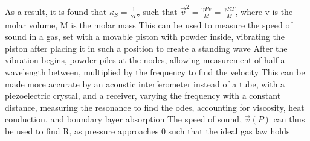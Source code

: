 \begin{outline*}
\3 As a result, it is found that $\kappa_S = \frac{1}{\gamma P}$, such that $\vec{v}^2 = \frac{\gamma P v}{M} = \frac{\gamma RT}{M}$, where v is the molar volume, M is the molar mass
\3 This can be used to measure the speed of sound in a gas, set with a movable piston with powder inside, vibrating the piston after placing it in such a position to create a standing wave
\4 After the vibration begins, powder piles at the nodes, allowing measurement of half a wavelength between, multiplied by the frequency to find the velocity
\4 This can be made more accurate by an acoustic interferometer instead of a tube, with a piezoelectric crystal, and a receiver, varying the frequency with a constant distance, measuring the resonance to find the odes, accounting for viscosity, heat conduction, and boundary layer absorption
\4 The speed of sound, $\vec{v}(P)$ can thus be used to find R, as pressure approaches 0 such that the ideal gas law holds
\end{outline*}
